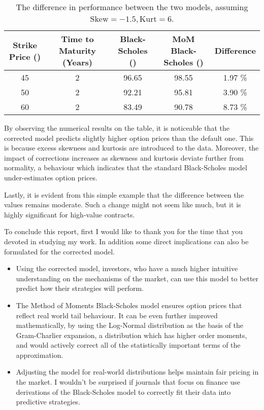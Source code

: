 \begin{table}[H]
	\centering
	\begin{tabular}{|c|c|c|c|c|}
		\hline
		Strike Price (\texteuro) & Time to Maturity (Years)	& Black-Scholes (\texteuro)	& MoM Black-Scholes (\texteuro)	& Difference \\
		\hline
		45 & 2 & 96.65 & 98.55 & 1.97 \% \\
		50 & 2 & 92.21 & 95.81 & 3.90 \% \\
		60 & 2 & 83.49 & 90.78 & 8.73 \% \\
		\hline
	\end{tabular}
	\caption{The difference in performance between the two models, assuming \(\text{Skew} = -1.5, \text{Kurt} = 6 \).}
\end{table}

By observing the numerical results on the table, it is noticeable that the corrected model predicts slightly higher option prices than the default one. This is because excess skewness and kurtosis are introduced to the data. Moreover, the impact of corrections increases as skewness and kurtosis deviate further from normality, a behaviour which indicates that the standard Black-Scholes model under-estimates option prices.

Lastly, it is evident from this simple example that the difference between the values remains moderate. Such a change might not seem like much, but it is highly significant for high-value contracts. 

To conclude this report, first I would like to thank you for the time that you devoted in studying my work. In addition some direct implications can also be formulated for the corrected model.

\begin{itemize}
	\item Using the corrected model, investors, who have a much higher intuitive understanding on the mechanisms of the market, can use this model to better predict how their strategies will perform.
	\item The Method of Moments Black-Scholes model ensures option prices that reflect real world tail behaviour. It can be even further improved mathematically, by using the Log-Normal distribution as the basis of the Gram-Charlier expansion, a distribution which has higher order moments, and would actively correct all of the statistically important terms of the approximation.
	\item Adjusting the model for real-world distributions helps maintain fair pricing in the market. I wouldn't be surprised if journals that focus on finance use derivations of the Black-Scholes model to correctly fit their data into predictive strategies.
\end{itemize}

